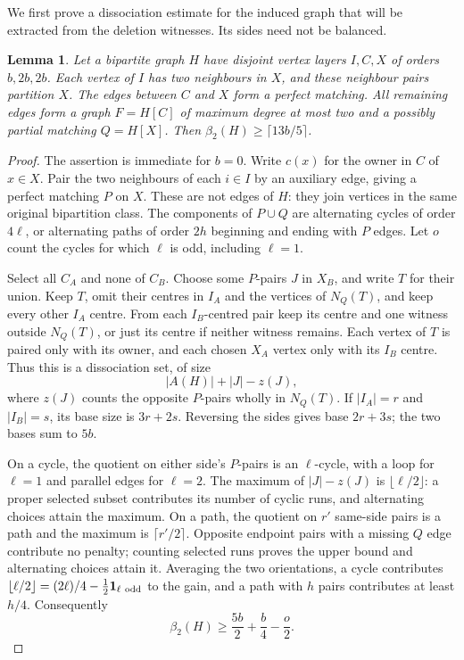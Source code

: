 \documentclass[11pt]{article}
\newtheorem{lemma}[theorem]{Lemma}
\newcommand{\diss}{\beta_2}
\begin{document}
We first prove a dissociation estimate for the induced graph that will
be extracted from the deletion witnesses. Its sides need not be balanced.

\begin{lemma}\label{lem:partial-template}
Let a bipartite graph $H$ have disjoint vertex layers $I,C,X$ of orders
$b,2b,2b$. Each vertex of $I$ has two neighbours in $X$, and these
neighbour pairs partition $X$. The edges between $C$ and $X$ form a
perfect matching. All remaining edges form a graph $F=H[C]$ of maximum
degree at most two and a possibly partial matching $Q=H[X]$.
Then $\diss(H)\ge\lceil13b/5\rceil$.
\end{lemma}
\begin{proof}
The assertion is immediate for $b=0$. Write $c(x)$ for the owner in $C$
of $x\in X$. Pair the two neighbours of each $i\in I$ by an auxiliary
edge, giving a perfect matching $P$ on $X$. These are not edges of $H$:
they join vertices in the same original bipartition class. The components
of $P\cup Q$ are alternating cycles of order $4\ell$, or alternating
paths of order $2h$ beginning and ending with $P$ edges.
Let $o$ count the cycles for which $\ell$ is odd, including $\ell=1$.

Select all $C_A$ and none of $C_B$. Choose some $P$-pairs $J$ in $X_B$,
and write $T$ for their union. Keep $T$, omit their centres in $I_A$
and the vertices of $N_Q(T)$, and keep every other $I_A$ centre.
From each $I_B$-centred pair keep its centre and one witness outside
$N_Q(T)$, or just its centre if neither witness remains. Each vertex
of $T$ is paired only with its owner, and each chosen $X_A$ vertex
only with its $I_B$ centre. Thus this is a dissociation set, of size
\[
 |A(H)|+|J|-z(J),
\]
where $z(J)$ counts the opposite $P$-pairs wholly in $N_Q(T)$.
If $|I_A|=r$ and $|I_B|=s$, its base size is $3r+2s$.
Reversing the sides gives base $2r+3s$; the two bases sum to $5b$.

On a cycle, the quotient on either side's $P$-pairs is an $\ell$-cycle,
with a loop for $\ell=1$ and parallel edges for $\ell=2$.
The maximum of $|J|-z(J)$ is $\lfloor\ell/2\rfloor$: a proper selected
subset contributes its number of cyclic runs, and alternating choices
attain the maximum. On a path, the quotient on $r'$ same-side pairs is
a path and the maximum is $\lceil r'/2\rceil$. Opposite endpoint pairs
with a missing $Q$ edge contribute no penalty; counting selected runs
proves the upper bound and alternating choices attain it.
Averaging the two orientations, a cycle contributes
$\lfloor\ell/2\rfloor=(2\ell)/4-\frac12\mathbf1_{\ell\ {\rm odd}}$
to the gain, and a path with $h$ pairs contributes at least $h/4$.
Consequently
\begin{equation}\label{eq:partial-one-side}
 \diss(H)\ge\frac{5b}{2}+\frac b4-\frac o2.
\end{equation}


\end{proof}
\end{document}

